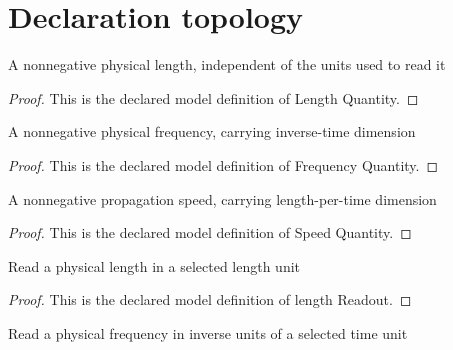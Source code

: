 \section{Declaration topology}
\begin{definition}
  \label{def:physics:phyx-mini-0224:phyxminiproblems-problemphyxmini0224-lengthquantity}
  A nonnegative physical length, independent of the units used to read it
\end{definition}
\begin{proof}
  This is the declared model definition of Length Quantity.
\end{proof}
\begin{definition}
  \label{def:physics:phyx-mini-0224:phyxminiproblems-problemphyxmini0224-frequencyquantity}
  A nonnegative physical frequency, carrying inverse-time dimension
\end{definition}
\begin{proof}
  This is the declared model definition of Frequency Quantity.
\end{proof}
\begin{definition}
  \label{def:physics:phyx-mini-0224:phyxminiproblems-problemphyxmini0224-speedquantity}
  A nonnegative propagation speed, carrying length-per-time dimension
\end{definition}
\begin{proof}
  This is the declared model definition of Speed Quantity.
\end{proof}
\begin{definition}
  \label{def:physics:phyx-mini-0224:phyxminiproblems-problemphyxmini0224-lengthreadout}
  Read a physical length in a selected length unit
\end{definition}
\begin{proof}
  This is the declared model definition of length Readout.
\end{proof}
\begin{definition}
  \label{def:physics:phyx-mini-0224:phyxminiproblems-problemphyxmini0224-frequencyreadout}
  Read a physical frequency in inverse units of a selected time unit
\end{definition}
